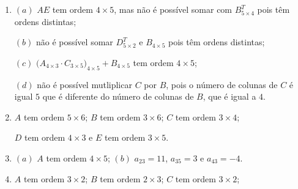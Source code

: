 \documentclass{report}
\begin{document}
\begin{enumerate}


\item $(a)$ $AE$ tem ordem $4 \times 5$, mas não é possível somar
com $B^T_{5 \times 4}$ pois têm ordens distintas;

$(b)$ não é possível somar $D^T_{5 \times 2}$ e $B_{4 \times 5}$
pois têm ordens distintas;

$(c)$ $\Big(A_{4 \times 3} \cdot C_{3 \times 5}\Big)_{4 \times 5}
+B_{4 \times 5}$ tem ordem $4 \times 5$;

$(d)$ não é possível mutliplicar $C$ por $B$, pois o número de
colunas de $C$ é igual $5$ que é diferente do número de colunas de
$B$, que é igual a $4$.


\item $A$ tem ordem $5 \times 6$; \hspace{0.5cm} $B$ tem ordem $3
\times 6$; \hspace{0.5cm} $C$ tem ordem $3 \times 4$;
\hspace{0.5cm}

$D$ tem ordem $4 \times 3$ \hspace{0.5cm} e \hspace{0.5cm} $E$ tem
ordem $3 \times 5$.


\item $(a)$ $A$ tem ordem $4 \times 5$; \hspace{1cm} $(b)$
$a_{23}=11$, \hspace{0.3cm} $a_{35}=3$ \hspace{0.3cm} e
\hspace{0.3cm} $a_{43}=-4$.



\item $A$ tem ordem $3 \times 2$; \hspace{0.5cm} $B$ tem ordem $2
\times 3$; \hspace{0.5cm} $C$ tem ordem $3 \times 2$;
\hspace{0.5cm}


\end{enumerate}
\end{document}
